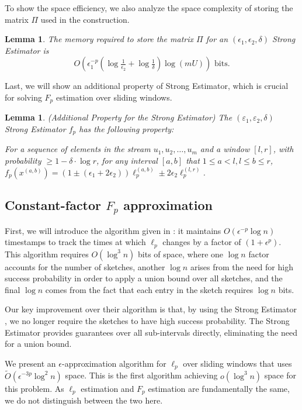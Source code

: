 \documentclass{article}
\newcommand{\est}{\textsf{Strong Estimator }}
\newcommand{\estt}{\textsf{Strong Estimator}}
\newcommand{\eps}{\varepsilon}
\theoremstyle{plain}
\newtheorem{lem}[theorem]{Lemma}
\begin{document}
To show the space efficiency, we also analyze the space complexity of storing the matrix $\Pi$ used in the construction.

\begin{lem}\label{space}
The memory required to store the matrix $\Pi$ for an $(\epsilon_1, \epsilon_2, \delta)$ \est is 
\[
O\left(\epsilon_1^{-p} \left( \log \tfrac{1}{\epsilon_2} + \log \tfrac{1}{\delta} \right) \log (mU)\right) \text{ bits}.
\]
\end{lem}

Last, we will show an additional property of \estt, which is crucial for solving $F_p$ estimation over sliding windows.  

\begin{lem}\label{add} (Additional Property for the \estt)
    The $(\eps_1, \eps_2, \delta)$ \est $f_p$ has the following property:

For a sequence of elements in the stream $u_1, u_2, \dots, u_m$ and a window $[l, r]$, with probability $\ge 1 - \delta \cdot \log r$, for any interval $[a, b]$ that $1 \le a < l, l \le b \le r$, $f_p(x ^ {(a, b)}) = (1 \pm (\epsilon_1 +2 \epsilon_2)) \ell_p ^ {(a, b)} \pm 2\epsilon_2 \ell_p ^ {(l,r)} $.  
    
\end{lem}

\subsection{Constant-factor $F_p$ approximation }

First, we will introduce the algorithm given in \cite{2007}: it maintains $O(\epsilon^{-p} \log n)$ timestamps to track the times at which $\ell_p$ changes by a factor of $(1 + \epsilon^p)$. This algorithm requires $O(\log^3 n)$ bits of space, where one $\log n$ factor accounts for the number of sketches, another $\log n$ arises from the need for high success probability in order to apply a union bound over all sketches, and the final $\log n$ comes from the fact that each entry in the sketch requires $\log n$ bits.

Our key improvement over their algorithm is that, by using the \est, we no longer require the sketches to have high success probability. The \est provides guarantees over all sub-intervals directly, eliminating the need for a union bound.

We present an $\epsilon$-approximation algorithm for $\ell_p$ over sliding windows that uses $\tilde{O}(\epsilon^{-3p} \log^2 n)$ space. This is the first algorithm achieving $o(\log^3 n)$ space for this problem. As $\ell_p$ estimation and $F_p$ estimation are fundamentally the same, we do not distinguish between the two here. 
\end{document}
